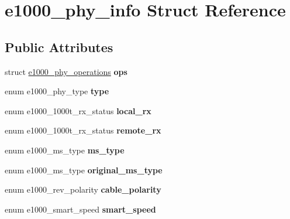 \hypertarget{structe1000__phy__info}{
\section{e1000\_\-phy\_\-info Struct Reference}
\label{structe1000__phy__info}
}
\subsection*{Public Attributes}
\begin{DoxyCompactItemize}
\item 
\hypertarget{structe1000__phy__info_a9f72e5ea9a53134dca331d957d8d65a9}{
struct \hyperlink{structe1000__phy__operations}{e1000\_\-phy\_\-operations} {\bfseries ops}}
\label{structe1000__phy__info_a9f72e5ea9a53134dca331d957d8d65a9}

\item 
\hypertarget{structe1000__phy__info_ac5febc867b9f4604343ccb6ae0fc7bcb}{
enum e1000\_\-phy\_\-type {\bfseries type}}
\label{structe1000__phy__info_ac5febc867b9f4604343ccb6ae0fc7bcb}

\item 
\hypertarget{structe1000__phy__info_a49782ba5c086b37cb796c3b58207e663}{
enum e1000\_\-1000t\_\-rx\_\-status {\bfseries local\_\-rx}}
\label{structe1000__phy__info_a49782ba5c086b37cb796c3b58207e663}

\item 
\hypertarget{structe1000__phy__info_ab489730033698aa7e1ec223ee29f9d5a}{
enum e1000\_\-1000t\_\-rx\_\-status {\bfseries remote\_\-rx}}
\label{structe1000__phy__info_ab489730033698aa7e1ec223ee29f9d5a}

\item 
\hypertarget{structe1000__phy__info_a9fcba70213682ccb467506245e964bb9}{
enum e1000\_\-ms\_\-type {\bfseries ms\_\-type}}
\label{structe1000__phy__info_a9fcba70213682ccb467506245e964bb9}

\item 
\hypertarget{structe1000__phy__info_abb5a75ee56dbdf04c67203dbfa9e4ba0}{
enum e1000\_\-ms\_\-type {\bfseries original\_\-ms\_\-type}}
\label{structe1000__phy__info_abb5a75ee56dbdf04c67203dbfa9e4ba0}

\item 
\hypertarget{structe1000__phy__info_a7b79bb0391b4905dd26ab6791b70be91}{
enum e1000\_\-rev\_\-polarity {\bfseries cable\_\-polarity}}
\label{structe1000__phy__info_a7b79bb0391b4905dd26ab6791b70be91}

\item 
\hypertarget{structe1000__phy__info_aedafa2abd99a8765d23dd75c7016550b}{
enum e1000\_\-smart\_\-speed {\bfseries smart\_\-speed}}
\label{structe1000__phy__info_aedafa2abd99a8765d23dd75c7016550b}


\end{DoxyCompactItemize}
